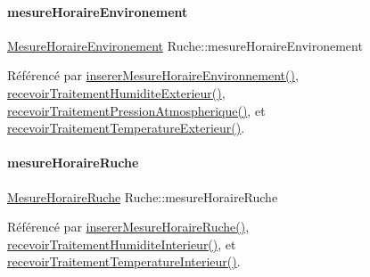 \mbox{\label{class_ruche_a73a826506110c10d9221065670985e52}} 
\paragraph{\texorpdfstring{mesure\+Horaire\+Environement}{mesureHoraireEnvironement}}
{\footnotesize\ttfamily \hyperlink{struct_mesure_horaire_environement}{Mesure\+Horaire\+Environement} Ruche\+::mesure\+Horaire\+Environement\hspace{0.3cm}{\ttfamily [private]}}



Référencé par \hyperlink{class_ruche_ac52e79446c5629645e02e27d2a01e56c}{inserer\+Mesure\+Horaire\+Environnement()}, \hyperlink{class_ruche_a59e89246b484d7b63851c0ebd20af6c5}{recevoir\+Traitement\+Humidite\+Exterieur()}, \hyperlink{class_ruche_aa42daeffa023c83fde40072601e1fa39}{recevoir\+Traitement\+Pression\+Atmospherique()}, et \hyperlink{class_ruche_a8482dda95a8a7888d5a60ea6f7d8729e}{recevoir\+Traitement\+Temperature\+Exterieur()}.

\mbox{\label{class_ruche_a9a68d3b7eb272e139f1532fdcbca2da3}} 
\paragraph{\texorpdfstring{mesure\+Horaire\+Ruche}{mesureHoraireRuche}}
{\footnotesize\ttfamily \hyperlink{struct_mesure_horaire_ruche}{Mesure\+Horaire\+Ruche} Ruche\+::mesure\+Horaire\+Ruche\hspace{0.3cm}{\ttfamily [private]}}



Référencé par \hyperlink{class_ruche_a3a093c088d9c97f347394c8a681f7302}{inserer\+Mesure\+Horaire\+Ruche()}, \hyperlink{class_ruche_a6d4c59f2850f803a0ed1946e737b4262}{recevoir\+Traitement\+Humidite\+Interieur()}, et \hyperlink{class_ruche_a2d2a681916140b977d45423d0d5d7b34}{recevoir\+Traitement\+Temperature\+Interieur()}.

\mbox{\label{class_ruche_a5e57df1ce7805b1ab0f6d8ef37504582}} 
